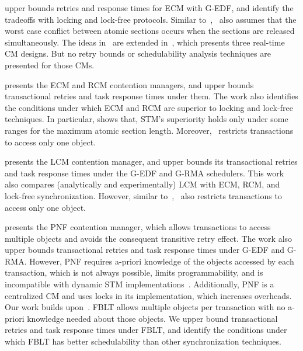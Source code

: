 \documentclass[conference]{IEEEtran}
\begin{document}
\cite{key-1} upper bounds retries and response times for  ECM with G-EDF, and identify the tradeoffs with locking and lock-free protocols. Similar to~\cite{schoeberl2010rttm},~\cite{key-1} also assumes that the worst case conflict between atomic sections occurs when the sections are released simultaneously. The ideas in~\cite{key-1} are extended in~\cite{barrosmanaging}, which presents three real-time CM designs. But no retry bounds or schedulability analysis techniques are presented for those CMs.

\cite{stmconcurrencycontrol:emsoft11} presents the ECM and RCM contention managers, and upper bounds transactional retries and task response times under them. The work also identifies the conditions under which ECM and RCM are superior to locking and lock-free techniques. In particular, \cite{stmconcurrencycontrol:emsoft11} shows that, STM's superiority holds only under some ranges for the maximum atomic section length. Moreover,~\cite{stmconcurrencycontrol:emsoft11} restricts transactions to access only one object.

\cite{lcmdac2012} presents the LCM contention manager, and upper bounds its transactional retries and task response times under the G-EDF and G-RMA schedulers. This work also compares (analytically and experimentally) LCM with ECM, RCM, and lock-free synchronization. However, similar to~\cite{stmconcurrencycontrol:emsoft11},~\cite{lcmdac2012} also restricts transactions to access only one object.

\cite{shambake_phd_proposal} presents the PNF contention manager, which allows transactions to access  multiple objects and avoids the consequent transitive retry effect. The work also upper bounds transactional retries and task response times under G-EDF and G-RMA. However, PNF requires a-priori knowledge of the objects accessed by each transaction, which is not always possible, limits programmability, and is incompatible with dynamic STM implementations~\cite{Herlihy:2003:STM:872035.872048}. Additionally, PNF is a centralized CM and uses locks in its implementation, which increases overheads. Our work builds upon~\cite{stmconcurrencycontrol:emsoft11,lcmdac2012,shambake_phd_proposal}. FBLT allows multiple objects per transaction with no a-priori knowledge needed about those objects. We upper bound transactional retries and task response times under FBLT, and identify the conditions under which FBLT has  better schedulability than other synchronization techniques.
\end{document}
